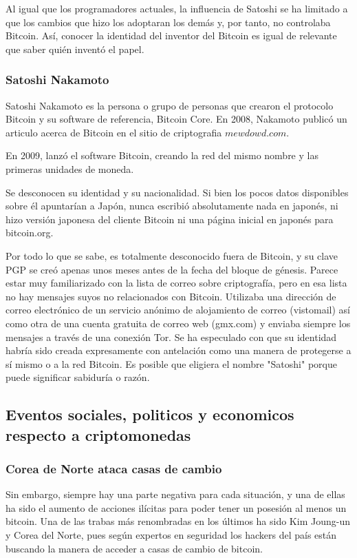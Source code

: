 \documentclass[12pt,letterpaper]{article}
\begin{document}
Al igual que los programadores actuales, la influencia de Satoshi se ha limitado a que los cambios que hizo los adoptaran los dem\'as y, por tanto, no controlaba Bitcoin. As\'i, conocer la identidad del inventor del Bitcoin es igual de relevante que saber qui\'en invent\'o el papel.
            
                \subsubsection*{Satoshi Nakamoto}
Satoshi Nakamoto es la persona o grupo de personas que crearon el protocolo Bitcoin y su software de referencia, Bitcoin Core. 
En 2008, Nakamoto public\'o un articulo acerca de Bitcoin en el sitio de criptografia $mewdowd.com$. 

En 2009, lanz\'o el software Bitcoin, creando la red del mismo nombre y las primeras unidades de moneda.

Se desconocen su identidad y su nacionalidad. Si bien los pocos datos disponibles sobre \'el apuntar\'ian a Jap\'on, nunca escribi\'o absolutamente nada en japon\'es, ni hizo versi\'on japonesa del cliente Bitcoin ni una p\'agina inicial en japon\'es para bitcoin.org.

Por todo lo que se sabe, es totalmente desconocido fuera de Bitcoin, y su clave PGP se cre\'o apenas unos meses antes de la fecha del bloque de g\'enesis. Parece estar muy familiarizado con la lista de correo sobre criptograf\'ia, pero en esa lista no hay mensajes suyos no relacionados con Bitcoin. Utilizaba una direcci\'on de correo electr\'onico de un servicio an\'onimo de alojamiento de correo (vistomail) as\'i como otra de una cuenta gratuita de correo web (gmx.com) y enviaba siempre los mensajes a trav\'es de una conexi\'on Tor. Se ha especulado con que su identidad habr\'ia sido creada expresamente con antelaci\'on como una manera de protegerse a s\'i mismo o a la red Bitcoin. Es posible que eligiera el nombre "Satoshi" porque puede significar sabidur\'ia o raz\'on. 

            \subsection*{Eventos sociales, politicos y economicos respecto a criptomonedas}
           	\subsubsection*{Corea de Norte ataca casas de cambio}
           	Sin embargo, siempre hay una parte negativa para cada situaci\'on, y una de ellas ha sido el aumento de acciones il\'icitas para poder tener un posesi\'on al menos un bitcoin. Una de las trabas m\'as renombradas en los \'ultimos ha sido Kim Joung-un y Corea del Norte, pues seg\'un expertos en seguridad los hackers del pa\'is est\'an buscando la manera de acceder a casas de cambio de bitcoin.
\end{document}
